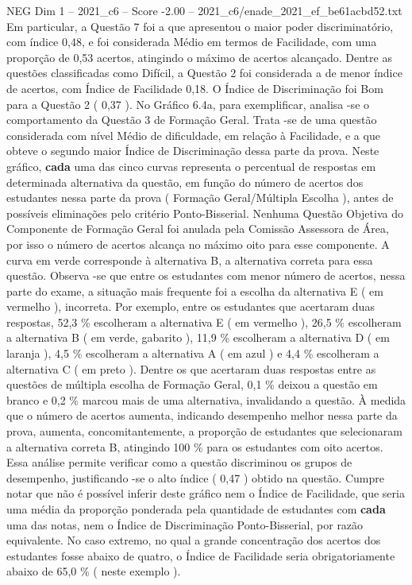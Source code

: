 \begin{textsample}{NEG Dim 1 – 2021\_c6 – Score -2.00 – 2021\_c6/enade\_2021\_ef\_be61acbd52.txt}
Em particular, a Questão 7 foi a que apresentou o maior poder discriminatório, com índice 0,48, e foi considerada Médio em termos de Facilidade, com uma proporção de 0,53 acertos, atingindo o máximo de acertos alcançado.
Dentre as questões classificadas como Difícil, a Questão 2 foi considerada a de menor índice de acertos, com Índice de Facilidade 0,18.
O Índice de Discriminação foi Bom para a Questão 2 ( 0,37 ).
No Gráfico 6.4a, para exemplificar, analisa -se o comportamento da Questão 3 de Formação Geral.
Trata -se de uma questão considerada com nível Médio de dificuldade, em relação à Facilidade, e a que obteve o segundo maior Índice de Discriminação dessa parte da prova.
Neste gráfico, \textbf{cada} uma das cinco curvas representa o percentual de respostas em determinada alternativa da questão, em função do número de acertos dos estudantes nessa parte da prova ( Formação Geral/Múltipla Escolha ), antes de possíveis eliminações pelo critério Ponto-Bisserial.
Nenhuma Questão Objetiva do Componente de Formação Geral foi anulada pela Comissão Assessora de Área, por isso o número de acertos alcança no máximo oito para esse componente.
A curva em verde corresponde à alternativa B, a alternativa correta para essa questão.
Observa -se que entre os estudantes com menor número de acertos, nessa parte do exame, a situação mais frequente foi a escolha da alternativa E ( em vermelho ), incorreta.
Por exemplo, entre os estudantes que acertaram duas respostas, 52,3 \% escolheram a alternativa E ( em vermelho ), 26,5 \% escolheram a alternativa B ( em verde, gabarito ), 11,9 \% escolheram a alternativa D ( em laranja ), 4,5 \% escolheram a alternativa A ( em azul ) e 4,4 \% escolheram a alternativa C ( em preto ).
Dentre os que acertaram duas respostas entre as questões de múltipla escolha de Formação Geral, 0,1 \% deixou a questão em branco e 0,2 \% marcou mais de uma alternativa, invalidando a questão.
À medida que o número de acertos aumenta, indicando desempenho melhor nessa parte da prova, aumenta, concomitantemente, a proporção de estudantes que selecionaram a alternativa correta B, atingindo 100 \% para os estudantes com oito acertos.
Essa análise permite verificar como a questão discriminou os grupos de desempenho, justificando -se o alto índice ( 0,47 ) obtido na questão.
Cumpre notar que não é possível inferir deste gráfico nem o Índice de Facilidade, que seria uma média da proporção ponderada pela quantidade de estudantes com \textbf{cada} uma das notas, nem o Índice de Discriminação Ponto-Bisserial, por razão equivalente.
No caso extremo, no qual a grande concentração dos acertos dos estudantes fosse abaixo de quatro, o Índice de Facilidade seria obrigatoriamente abaixo de 65,0 \% ( neste exemplo ).

\end{textsample}
